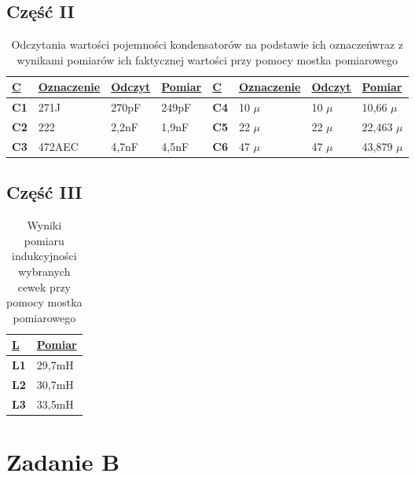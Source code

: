 \documentclass[polish,polish,a4paper]{article}
\begin{document}
\subsection{Część II}
\begin{table}[!h]
\centering
\begin{tabular}{|y|l|l|l|y|l|l|l|}
\hline
{}
\textbf{\underline{C}} & \textbf{\underline{Oznaczenie}} & \textbf{\underline{Odczyt}} & \textbf{\underline{Pomiar}} & \textbf{\underline{C}} & \textbf{\underline{Oznaczenie}} & \textbf{\underline{Odczyt}} & \textbf{\underline{Pomiar}} \\
\hline
\textbf{C1} & 271J & 270pF & 249pF &
\textbf{C4} & 10 $\mu$ & 10 $\mu$ & 10,66 $\mu$ \\
\hline
\textbf{C2} & 222 & 2,2nF & 1,9nF &
\textbf{C5} & 22 $\mu$ & 22 $\mu$ & 22,463 $\mu$ \\
\hline
\textbf{C3} & 472AEC & 4,7nF & 4,5nF &
\textbf{C6} & 47 $\mu$ & 47 $\mu$ & 43,879 $\mu$ \\
\hline

\end{tabular}
\caption{Odczytania wartości pojemności kondensatorów na podstawie ich oznaczeńwraz z wynikami pomiarów ich faktycznej wartości przy pomocy mostka pomiarowego}
\end{table}
\subsection{Część III}
\begin{table}[!h]
\centering
\begin{tabular}{|y|l|}
\hline
{}
\textbf{\underline{L}} & \textbf{\underline{Pomiar}} \\
\hline
\textbf{L1} &
29,7mH
\\
\hline
\textbf{L2}&
30,7mH 
\\
\hline
\textbf{L3} &
33,5mH
\\
\hline

\end{tabular}
\caption{Wyniki pomiaru indukcyjności wybranych cewek przy pomocy mostka pomiarowego}
\end{table}
\section{Zadanie B}
\end{document}
